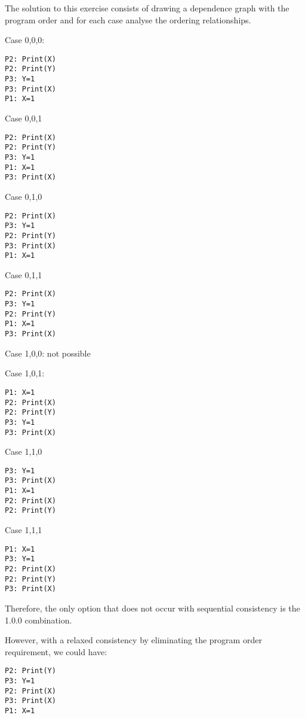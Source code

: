 \newpage
\begin{acsolution}\end{acsolution}

The solution to this exercise consists of drawing a dependence graph with the program order
 and for each case analyse the ordering relationships.

Case 0,0,0:

\begin{lstlisting}
P2: Print(X)
P2: Print(Y)
P3: Y=1
P3: Print(X)
P1: X=1
\end{lstlisting}

Case 0,0,1

\begin{lstlisting}
P2: Print(X)
P2: Print(Y)
P3: Y=1
P1: X=1
P3: Print(X)
\end{lstlisting}

Case 0,1,0

\begin{lstlisting}
P2: Print(X)
P3: Y=1
P2: Print(Y)
P3: Print(X)
P1: X=1
\end{lstlisting}

Case 0,1,1

\begin{lstlisting}
P2: Print(X)
P3: Y=1
P2: Print(Y)
P1: X=1
P3: Print(X)
\end{lstlisting}

Case 1,0,0: {\color{red}not possible}

Case 1,0,1:

\begin{lstlisting}
P1: X=1
P2: Print(X)
P2: Print(Y)
P3: Y=1
P3: Print(X)
\end{lstlisting}

Case 1,1,0

\begin{lstlisting}
P3: Y=1
P3: Print(X)
P1: X=1
P2: Print(X)
P2: Print(Y)
\end{lstlisting}

Case 1,1,1

\begin{lstlisting}
P1: X=1
P3: Y=1
P2: Print(X)
P2: Print(Y)
P3: Print(X)
\end{lstlisting}

Therefore, the only option that does not occur with sequential consistency is the 1.0.0 combination.

However, with a relaxed consistency by eliminating the program order requirement, we could have:

\begin{lstlisting}
P2: Print(Y)
P3: Y=1
P2: Print(X)
P3: Print(X)
P1: X=1
\end{lstlisting}
